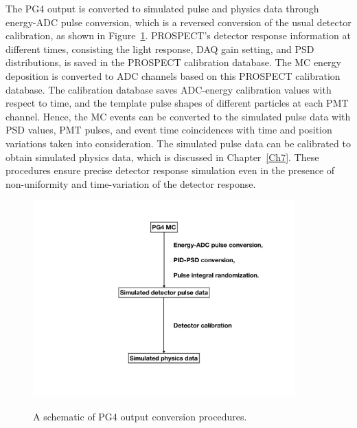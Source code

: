 The PG4 output is converted to simulated pulse and physics data through energy-ADC pulse conversion, which is a reversed conversion of the usual detector calibration, as shown in Figure~\ref{fig:MCconversion}.
PROSPECT's detector response information at different times, consisting the light response, DAQ gain setting, and PSD distributions, is saved in the PROSPECT calibration database. 
The MC energy deposition is converted to ADC channels based on this PROSPECT calibration database.
The calibration database saves ADC-energy calibration values with respect to time, and the template pulse shapes of different particles at each PMT channel.
Hence, the MC events can be converted to the simulated pulse data with PSD values, PMT pulses, and event time coincidences with time and position variations taken into consideration. 
The simulated pulse data can be calibrated to obtain simulated physics data, which is discussed in Chapter~\ref{Ch7}.
These procedures ensure precise detector response simulation even in the presence of non-uniformity and time-variation of the detector response.

\begin{figure}[h!]
    \centering
    \includegraphics[width=0.9\textwidth]{Figures/MCconversion.pdf}\\
	\caption[Schematic of PG4 output conversion]{
	A schematic of PG4 output conversion procedures.
    }
    \label{fig:MCconversion}
\end{figure}